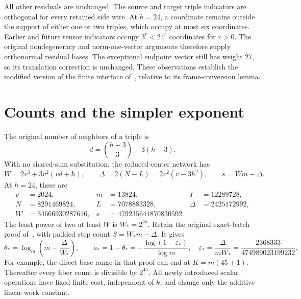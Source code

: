 \documentclass[11pt]{article}
\begin{document}
All other residuals are unchanged. The source and target triple indicators are orthogonal for every retained side wire. At $h=24$, a coordinate remains outside the support of either one or two triples, which occupy at most six coordinates. Earlier and future tensor indicators occupy $3^r<24^r$ coordinates for $r>0$. The original nondegeneracy and norm-one-vector arguments therefore supply orthonormal residual bases. The exceptional endpoint vector still has weight $27$, so its translation correction is unchanged. These observations establish the modified version of the finite interface of~\cite[Proposition~2.4]{O}, relative to its frame-conversion lemma.

\section{Counts and the simpler exponent}
The original number of neighbors of a triple is
\[
 d=\binom{h-3}{3}+3(h-3).
\]
With no shared-sum substitution, the reduced-center network has
\begin{equation}\label{eq:counts}
 W=2v^3+3v^2(vd+h),\qquad
 \Delta=2(N-L)=2v^2(v-3h^2),\qquad s=Wm-\Delta.
\end{equation}
At $h=24$, these are
\begin{align*}
 v&=2024,&m&=13824,& I&=12289728,\\
 N&=8291469824,&L&=7078883328,&\Delta&=2425172992,\\
 W&=34666930287616,&s&=479235641870830592.
\end{align*}
The least power of two at least $W$ is $W_*=2^{45}$. Retain the original exact-batch proof of~\cite[Theorem~2.6]{O}, with padded step count $S=W_*m-\Delta$. It gives
\[
 \theta_* = \log_m\!\left(m-\frac{\Delta}{W_*}\right),\qquad
 a_* =1-\theta_* =
 -\frac{\log(1-\varepsilon_*)}{\log m},\quad
 \varepsilon_* = \frac{\Delta}{mW_*}=
 \frac{2368333}{474989023199232}.
\]
For example, the direct base range in that proof can end at $K=m(45+1)$. Thereafter every fiber count is divisible by $2^{45}$. All newly introduced scalar operations have fixed finite cost, independent of $k$, and change only the additive linear-work constant.
\end{document}

